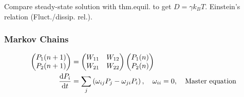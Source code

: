 \documentclass[a4paper, english, 12pt]{article}
\newcommand{\closed}[1]{\left( #1 \right)}
\begin{document}
\begin{multicols*}{2}
Compare steady-state solution with thm.equil. to get $\boxed{D=\gamma k_B T}$. Einstein's relation (Fluct./dissip. rel.).  

\subsubsection*{\scriptsize Markov Chains}

\begin{align*}
    \begin{pmatrix}
        P_1 (n+1) \\
        P_2 (n+1)
    \end{pmatrix}
    &= \begin{pmatrix}
        W_{11} & W_{12} \\ 
        W_{21} & W_{22}
    \end{pmatrix}
    \begin{pmatrix}
        P_1 (n) \\
        P_2 (n)
    \end{pmatrix} \\ 
    \dv{P_i}{t} &= \sum_{j} \closed{\omega_{ij}P_j - \omega_{ji}P_i},\quad \omega_{ii}=0,\quad\text{Master equation}
\end{align*}


\end{multicols*}
\end{document}
